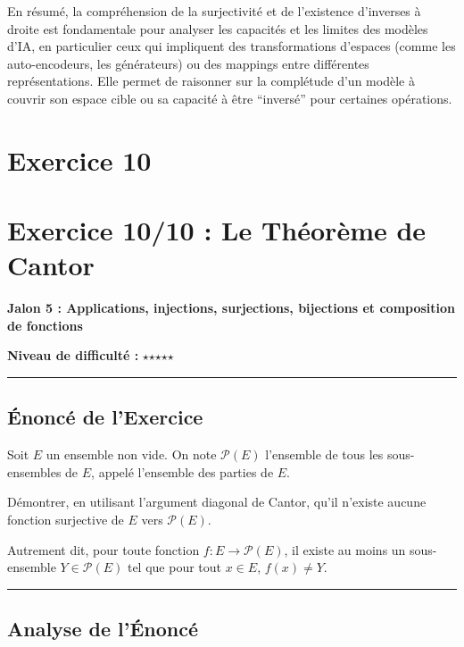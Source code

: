 \documentclass[12pt,a4paper]{report}
\begin{document}
En résumé, la compréhension de la surjectivité et de l'existence
d'inverses à droite est fondamentale pour analyser les capacités et les
limites des modèles d'IA, en particulier ceux qui impliquent des
transformations d'espaces (comme les auto-encodeurs, les générateurs) ou
des mappings entre différentes représentations. Elle permet de raisonner
sur la complétude d'un modèle à couvrir son espace cible ou sa capacité
à être ``inversé'' pour certaines opérations.
\newpage
\section{Exercice 10}
\section{Exercice 10/10 : Le Théorème de
Cantor}\label{exercice-1010-le-thuxe9oruxe8me-de-cantor}

\textbf{Jalon 5 : Applications, injections, surjections, bijections et
composition de fonctions}

\textbf{Niveau de difficulté :}
\(\star\)\(\star\)\(\star\)\(\star\)\(\star\)

\begin{center}\rule{0.5\linewidth}{0.5pt}\end{center}

\subsection{Énoncé de l'Exercice}\label{uxe9noncuxe9-de-lexercice}

Soit \(E\) un ensemble non vide. On note \(\mathcal{P}(E)\) l'ensemble
de tous les sous-ensembles de \(E\), appelé l'ensemble des parties de
\(E\).

Démontrer, en utilisant l'argument diagonal de Cantor, qu'il n'existe
aucune fonction surjective de \(E\) vers \(\mathcal{P}(E)\).

Autrement dit, pour toute fonction \(f: E \to \mathcal{P}(E)\), il
existe au moins un sous-ensemble \(Y \in \mathcal{P}(E)\) tel que pour
tout \(x \in E\), \(f(x) \neq Y\).

\begin{center}\rule{0.5\linewidth}{0.5pt}\end{center}

\subsection{Analyse de l'Énoncé}\label{analyse-de-luxe9noncuxe9}
\end{document}
